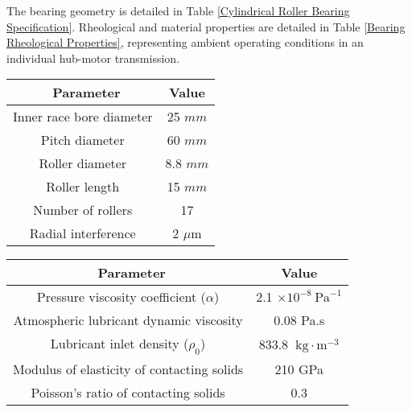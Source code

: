 The bearing geometry is detailed in Table \ref{Cylindrical Roller Bearing Specification}. Rheological and material properties are detailed in Table \ref{Bearing Rheological Properties}, representing ambient operating conditions in an individual hub-motor transmission. 

\begin{table*}
	\caption{Cylindrical Roller Bearing Specification}
	\label{Cylindrical Roller Bearing Specification}
	\centering
	\renewcommand{\arraystretch}{1.5}%
	\begin{tabular}{|c|c|}
		\hline
		\ \textbf{Parameter} & \textbf{Value} \\ [0.5ex]
		\hline
		Inner race bore diameter & 25 $mm$ \\ [0.5ex]
		\hline
		Pitch diameter & 60 $mm$ \\ [0.5ex]
		\hline
		Roller diameter & 8.8 $mm$ \\ [0.5ex]
		\hline
	    Roller length & 15 $mm$ \\ [0.5ex]
		\hline
	    Number of rollers & 17 \\ [0.5ex]
		\hline
		Radial interference & 2 $\mu \mathrm{m}$ \\ [0.5ex]
		\hline
	\end{tabular}
\end{table*}

\begin{table*}
	\caption{Bearing Rheological Properties}
	\label{Bearing Rheological Properties}
	\centering
	\renewcommand{\arraystretch}{1.5}%
	\begin{tabular}{|c|c|}
		\hline
		\ \textbf{Parameter} & \textbf{Value} \\ [0.5ex]
		\hline
		Pressure viscosity coefficient ($\alpha$) & 2.1 $\times 10^{-8}\mathrm{~Pa}^{-1}$ \\ [0.5ex]
		\hline
		Atmospheric lubricant dynamic viscosity & 0.08 Pa.s \\ [0.5ex]
		\hline
		Lubricant inlet density ($\rho_0$) & 833.8 $\mathrm{~kg}\cdot\mathrm{m}^{-3}$ \\ [0.5ex]
		\hline
		Modulus of elasticity of contacting solids & 210 GPa \\ [0.5ex]
		\hline
	    Poisson’s ratio of contacting solids & 0.3 \\ [0.5ex]
		\hline
	\end{tabular}
\end{table*}

